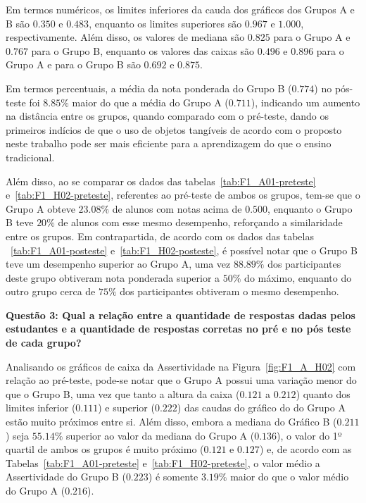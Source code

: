 Em termos numéricos, os limites inferiores da cauda dos gráficos dos Grupos A e B são $0.350$ e $0.483$, enquanto os limites superiores são $0.967$ e $1.000$, respectivamente. Além disso, os valores de mediana são $0.825$ para o Grupo A e $0.767$ para o Grupo B, enquanto os valores das caixas são $0.496$ e $0.896$ para o Grupo A e para o Grupo B são $0.692$ e $0.875$.

Em termos percentuais, a média da nota ponderada do Grupo B ($0.774$) no pós-teste foi $8.85\%$ maior do que a média do Grupo A ($0.711$), indicando um aumento na distância entre os grupos, quando comparado com o pré-teste, dando os primeiros indícios de que o uso de objetos tangíveis de acordo com o proposto neste trabalho pode ser mais eficiente para a aprendizagem do que o ensino tradicional. 

Além disso, ao se comparar os dados das tabelas~\ref{tab:F1_A01-preteste} e~\ref{tab:F1_H02-preteste}, referentes ao pré-teste de ambos os grupos, tem-se que o Grupo A obteve $23.08\%$ de alunos com notas acima de $0.500$, enquanto o Grupo B teve $20\%$ de alunos com esse mesmo desempenho, reforçando a similaridade entre os grupos. Em contrapartida, de acordo com os dados das tabelas ~\ref{tab:F1_A01-posteste} e~\ref{tab:F1_H02-posteste}, é possível notar que o Grupo B teve um desempenho superior ao Grupo A, uma vez $88.89\%$ dos participantes deste grupo obtiveram nota ponderada superior a $50\%$ do máximo, enquanto do outro grupo cerca de $75\%$ dos participantes obtiveram o mesmo desempenho.

\textbf{Questão 3: Qual a relação entre a quantidade de respostas dadas pelos estudantes e a quantidade de respostas corretas no pré e no pós teste de cada grupo?}

Analisando os gráficos de caixa da Assertividade na Figura~\ref{fig:F1_A_H02} com relação ao pré-teste, pode-se notar que o Grupo A possui uma variação menor do que o Grupo B, uma vez que tanto a altura da caixa ($0.121$ a $0.212$) quanto dos limites inferior ($0.111$) e superior ($0.222$) das caudas do gráfico do do Grupo A estão muito próximos entre si. Além disso, embora a mediana do Gráfico B ($0.211$) seja $55.14\%$ superior ao valor da mediana do Grupo A ($0.136$), o valor do 1º quartil de ambos os grupos é muito próximo ($0.121$ e $0.127$) e, de acordo com as Tabelas~\ref{tab:F1_A01-preteste} e~\ref{tab:F1_H02-preteste}, o valor médio a Assertividade do Grupo B ($0.223$) é somente $3.19\%$ maior do que o valor médio do Grupo A ($0.216$).

